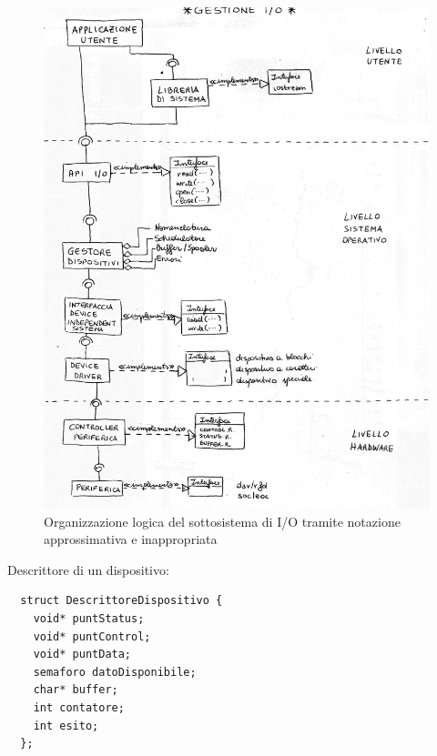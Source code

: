 \documentclass[12pt,a4paper]{article}
\begin{document}
\begin{figure}[H]
\centering
\includegraphics[width=17cm]{img/io/io-abstract.png}
\caption{Organizzazione logica del sottosistema di I/O tramite notazione approssimativa e inappropriata}
\end{figure}

Descrittore di un dispositivo:
\begin{verbatim}
  struct DescrittoreDispositivo {
    void* puntStatus;
    void* puntControl;
    void* puntData;
    semaforo datoDisponibile;
    char* buffer;
    int contatore;
    int esito;
  };
\end{verbatim}
\end{document}
